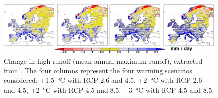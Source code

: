 \begin{figure}
    \centering
    \includegraphics[width=\textwidth]{figures/ita_flood/donnelly}
    \decoRule
    \caption[High runoff change in Europe according to \citet{Donnelly2017}]{
        Change in high runoff (mean annual maximum runoff), extracted from \citet[][figure  4]{Donnelly2017}. The four columns represent the four warming scenarios considered: +\SI{1.5}{\celsius} with RCP 2.6 and 4.5, +\SI{2}{\celsius} with RCP 2.6 and 4.5, +\SI{2}{\celsius} with RCP 4.5 and 8.5, +\SI{3}{\celsius} with RCP 4.5 and 8.5.
    }
    \label{fig:donnelly_change}
\end{figure}


